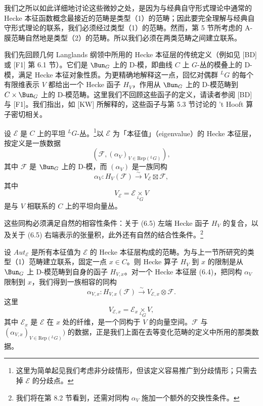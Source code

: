 我们之所以如此详细地讨论这些微妙之处，是因为与经典自守形式理论中通常的 Hecke 本征函数概念最接近的范畴是类型（1）的范畴；因此要完全理解与经典自守形式理论的联系，我们必须经过类型（1）的范畴。然而，第 5 节所考虑的 A-膜范畴自然地是类型（2）的范畴。所以我们必须在两类范畴之间建立联系。

我们先回顾几何 Langlands 纲领中所用的 Hecke 本征层的传统定义（例如见 [BD] 或 [F1] 第 6.1 节）。它们是 $\Bun_G$ 上的 D-模，即曲线 $C$ 上 $G$-丛的模叠上的 D-模，满足 Hecke 本征对象性质。为更精确地解释这一点，回忆对偶群 ${}^LG$ 的每个有限维表示 $V$ 都给出一个 Hecke 函子 $H_V$，作用从 $\Bun_G$ 上的 D-模范畴到 $C\times\Bun_G$ 上的 D-模范畴。这里我们不回顾这些函子的定义，请读者参阅 [BD] 与 [F1]。我们指出，如 [KW] 所解释的，这些函子与第 5.3 节讨论的 't Hooft 算子密切相关。


设 $\mathcal{E}$ 是 $C$ 上的平坦 ${}^LG$-丛。\footnote{这里为简单起见我们考虑非分歧情形，但该定义容易推广到分歧情形；只需去掉 $\mathcal{E}$ 的分歧点。}以 $\mathcal{E}$ 为「本征值」（eigenvalue）的 Hecke 本征层，按定义是一族数据
\begin{equation}\tag{6.4}
(\mathcal{F},(\alpha_V)_{V\in\mathrm{Rep}({}^LG)}),
\end{equation}
其中 $\mathcal{F}$ 是 $\Bun_G$ 上的 D-模，而 $(\alpha_V)$ 是一族同构
\begin{equation}\tag{6.5}
\alpha_V : H_V(\mathcal{F})\xrightarrow{\sim} V_{\mathcal{E}}\boxtimes\mathcal{F},
\end{equation}
其中
\[
V_{\mathcal{E}} = \mathcal{E}\underset{{}^LG}{\times} V
\]
是与 $V$ 相联系的 $C$ 上的平坦向量丛。

这些同构必须满足自然的相容性条件：关于 (6.5) 左端 Hecke 函子 $H_V$ 的复合，以及关于 (6.5) 右端表示的张量积，此外还有自然的结合性条件。\footnote{我们将在第 8.2 节看到，还需对同构 $\alpha_V$ 施加一个额外的交换性条件。}

设 $Aut_{\mathcal{E}}$ 是所有本征值为 $\mathcal{E}$ 的 Hecke 本征层构成的范畴。为与上一节所研究的类型（1）范畴建立联系，固定一点 $x\in C$。则 Hecke 算子 $H_V$ 到 $x$ 的限制是从 $\Bun_G$ 上 D-模范畴到自身的函子 $H_{V,x}$。对一个 Hecke 本征层 (6.4)，把同构 $\alpha_V$ 限制到 $x$，我们得到一族相容的同构
\begin{equation}\tag{6.6}
\alpha_{V,x} : H_{V,x}(\mathcal{F})\xrightarrow{\sim} V_{\mathcal{E},x}\otimes\mathcal{F}.
\end{equation}
这里
\[
V_{\mathcal{E},x} = \mathcal{E}_x\underset{{}^LG}{\times} V,
\]
其中 $\mathcal{E}_x$ 是 $\mathcal{E}$ 在 $x$ 处的纤维，是一个同构于 $V$ 的向量空间。$\mathcal{F}$ 与 $(\alpha_{V,x})_{V\in\mathrm{Rep}({}^LG)})$ 的数据，正是我们上面在去等变化范畴的定义中所用的那类数据。

